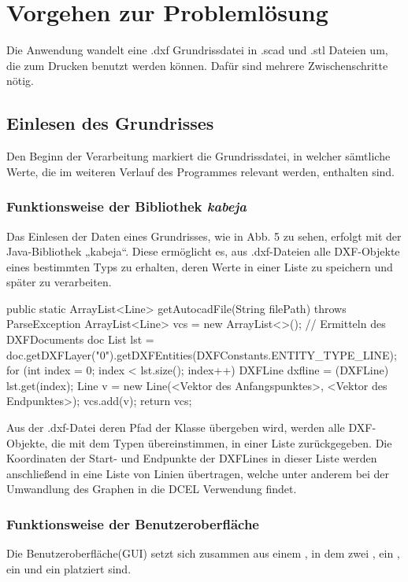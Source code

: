 \chapter{Vorgehen zur Problemlösung}
Die Anwendung wandelt eine .dxf Grundrissdatei in .scad und .stl Dateien um, die zum Drucken benutzt werden können.
Dafür sind mehrere Zwischenschritte nötig.
\section{Einlesen des Grundrisses}
Den Beginn der Verarbeitung markiert die Grundrissdatei, in welcher sämtliche Werte, die im weiteren Verlauf des Programmes relevant werden, enthalten sind.
\subsection{Funktionsweise der Bibliothek \textit{kabeja}}
Das Einlesen der Daten eines Grundrisses, wie in Abb. 5 zu sehen, erfolgt mit der Java-Bibliothek „kabeja“. 
Diese ermöglicht es, aus .dxf-Dateien alle DXF-Objekte eines bestimmten Typs zu erhalten, deren Werte in einer Liste zu speichern und später zu verarbeiten. \\

\begin{code}
public static ArrayList<Line> getAutocadFile(String filePath) throws ParseException {
	ArrayList<Line> vcs = new ArrayList<>();
	// Ermitteln des DXFDocuments doc
	List lst = doc.getDXFLayer("0").getDXFEntities(DXFConstants.ENTITY_TYPE_LINE);
	for (int index = 0; index < lst.size(); index++) {
		DXFLine dxfline = (DXFLine) lst.get(index);
		Line v = new Line(<Vektor des Anfangspunktes>, <Vektor des Endpunktes>);
		vcs.add(v);
	}
	return vcs;
}
\end{code}

Aus der .dxf-Datei deren Pfad der Klasse  übergeben wird, werden alle DXF-Objekte, die mit dem Typen  übereinstimmen, in einer Liste zurückgegeben. 
Die Koordinaten der Start- und Endpunkte der DXFLines  in dieser Liste werden anschließend in eine Liste von Linien übertragen, welche unter anderem bei der Umwandlung des Graphen in die DCEL Verwendung findet.

\subsection{Funktionsweise der Benutzeroberfläche}
Die Benutzeroberfläche(GUI) setzt sich zusammen aus einem , in dem zwei , ein , ein  und ein  platziert sind.

